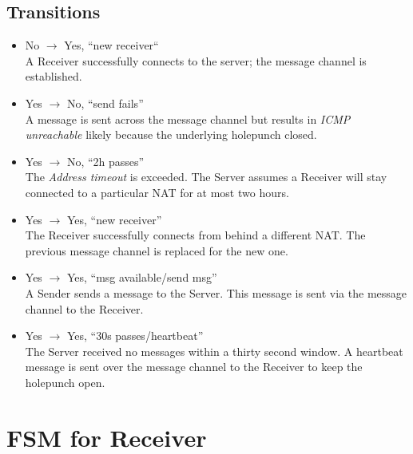 \documentclass[11pt]{article}
\begin{document}
\subsection*{Transitions}
\begin{itemize}
\item No $\rightarrow$ Yes, ``new receiver`` \\
A Receiver successfully connects to the server; the message channel is
established.
\item Yes $\rightarrow$ No, ``send fails'' \\
A message is sent across the message channel but results in \textit{ICMP
unreachable} likely because the underlying holepunch closed.
\item Yes $\rightarrow$ No, ``2h passes'' \\
The \textit{Address timeout} is exceeded. The Server assumes a Receiver will
stay connected to a particular NAT for at most two hours.
\item Yes $\rightarrow$ Yes, ``new receiver'' \\
The Receiver successfully connects from behind a different NAT. The previous
message channel is replaced for the new one.
\item Yes $\rightarrow$ Yes, ``msg available/send msg'' \\
A Sender sends a message to the Server. This message is sent via the message
channel to the Receiver.
\item Yes $\rightarrow$ Yes, ``30s passes/heartbeat'' \\
The Server received no messages within a thirty second window. A heartbeat
message is sent over the message channel to the Receiver to keep the holepunch
open.
\end{itemize}

\pagebreak

\section*{FSM for Receiver}
\end{document}
